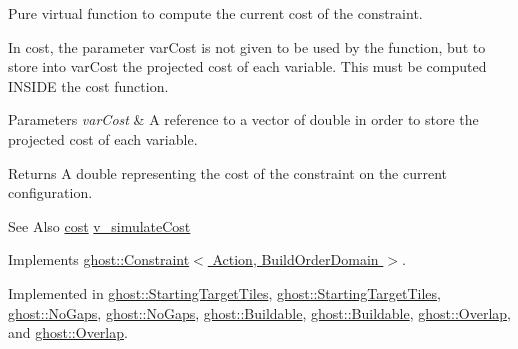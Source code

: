 Pure virtual function to compute the current cost of the constraint. 

In cost, the parameter var\-Cost is not given to be used by the function, but to store into var\-Cost the projected cost of each variable. This must be computed I\-N\-S\-I\-D\-E the cost function.


\begin{DoxyParams}{Parameters}
{\em var\-Cost} & A reference to a vector of double in order to store the projected cost of each variable. \\
\hline
\end{DoxyParams}
\begin{DoxyReturn}{Returns}
A double representing the cost of the constraint on the current configuration. 
\end{DoxyReturn}
\begin{DoxySeeAlso}{See Also}
\hyperlink{classghost_1_1BuildOrderConstraint_a6700969d5de0d199e57fbe3f0a95ed68}{cost} \hyperlink{classghost_1_1BuildOrderConstraint_ad6727d0cf49d366a631fddc5b5ef80cf}{v\-\_\-simulate\-Cost} 
\end{DoxySeeAlso}


Implements \hyperlink{classghost_1_1Constraint_ac67f7952cdf7212327b7db506225d12c}{ghost\-::\-Constraint$<$ Action, Build\-Order\-Domain $>$}.



Implemented in \hyperlink{classghost_1_1StartingTargetTiles_aa9474c7fb81691a2059d2e5614702544}{ghost\-::\-Starting\-Target\-Tiles}, \hyperlink{classghost_1_1StartingTargetTiles_aa9474c7fb81691a2059d2e5614702544}{ghost\-::\-Starting\-Target\-Tiles}, \hyperlink{classghost_1_1NoGaps_a3fa23de6946e443f009ecb5054a96572}{ghost\-::\-No\-Gaps}, \hyperlink{classghost_1_1NoGaps_a3fa23de6946e443f009ecb5054a96572}{ghost\-::\-No\-Gaps}, \hyperlink{classghost_1_1Buildable_a584162de15bdeb91c7f9a0d0a0fa3c87}{ghost\-::\-Buildable}, \hyperlink{classghost_1_1Buildable_a584162de15bdeb91c7f9a0d0a0fa3c87}{ghost\-::\-Buildable}, \hyperlink{classghost_1_1Overlap_a7a926991f06c785126e5d7995953e493}{ghost\-::\-Overlap}, and \hyperlink{classghost_1_1Overlap_a7a926991f06c785126e5d7995953e493}{ghost\-::\-Overlap}.

